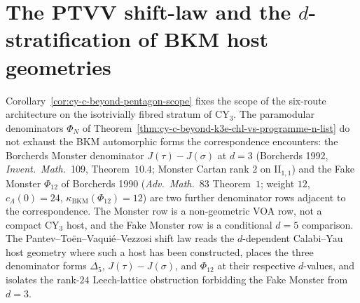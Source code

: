 \section{The PTVV shift-law and the \texorpdfstring{$d$}{d}-stratification of BKM host geometries}
\label{sec:cy-c-beyond-ptvv-shift-law}

Corollary~\ref{cor:cy-c-beyond-pentagon-scope} fixes the scope of the six-route
architecture on the isotrivially fibred stratum of $\mathrm{CY}_3$. The paramodular
denominators $\Phi_N$ of Theorem~\ref{thm:cy-c-beyond-k3e-chl-vs-programme-n-list}
do not exhaust the BKM automorphic forms the correspondence encounters:
the Borcherds Monster denominator \(J(\tau)-J(\sigma)\) at $d = 3$ (Borcherds 1992,
\emph{Invent.\ Math.}~109, Theorem~$10.4$; Monster Cartan rank $2$ on $\mathrm{II}_{1, 1}$) and the Fake Monster $\Phi_{12}$ of Borcherds 1990 (\emph{Adv.\ Math.}~83
\textup{Theorem}~$1$; weight $12$, $c_\Lambda(0) = 24$, $\kappa_{\mathrm{BKM}}(\Phi_{12}) = 12$)
are two further denominator rows adjacent to the correspondence. The Monster
row is a non-geometric VOA row, not a compact CY$_3$ host, and the Fake
Monster row is a conditional \(d=5\) comparison. The Pantev--To\"en--Vaqui\'e--Vezzosi shift law
reads the $d$-dependent Calabi--Yau host geometry where such a host has
been constructed,
places the three denominator forms
\(\Delta_5\), \(J(\tau)-J(\sigma)\), and \(\Phi_{12}\) at their respective
$d$-values, and isolates the rank-$24$ Leech-lattice obstruction
forbidding the Fake Monster from $d = 3$.

